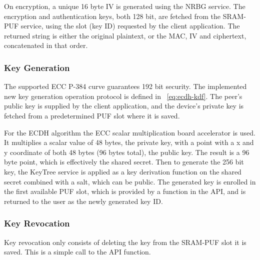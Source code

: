 On encryption, a unique 16 byte \ac{IV} is generated using the \ac{NRBG} service.
The encryption and authentication keys, both 128 bit, are fetched from the SRAM-PUF service, using the slot (key ID) requested by the client application.
The returned string is either the original plaintext, or the \ac{MAC}, \ac{IV} and ciphertext, concatenated in that order.




\subsubsection*{Key Generation}
The supported \ac{ECC} P-384 curve guarantees 192 bit security.
The implemented new key generation operation protocol is defined in ~\ref{eq:ecdh-kdf}.
The peer's public key is supplied by the client application, and the device's private key is fetched from a predetermined PUF slot where it is saved.

For the ECDH algorithm the ECC scalar multiplication board accelerator is used. It multiplies a scalar value of 48 bytes, the private key, with a point with a x and y coordinate of both 48 bytes (96 bytes total), the public key.
The result is a 96 byte point, which is effectively the shared secret.
Then to generate the 256 bit key, the KeyTree service is applied as a key derivation function on the shared secret combined with a salt, which can be public.
The generated key is enrolled in the first available PUF slot, which is provided by a function in the API, and is returned to the user as the newly generated key ID.

\subsubsection*{Key Revocation}
Key revocation only consists of deleting the key from the SRAM-PUF slot it is saved. This is a simple call to the API function.

